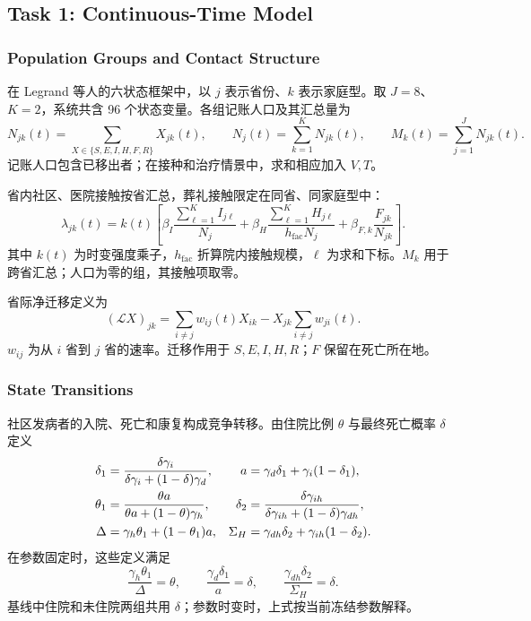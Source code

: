 \subsection{Task 1: Continuous-Time Model}
\label{sec:task-1}

\subsubsection{Population Groups and Contact Structure}

在 Legrand 等人的六状态框架\cite{legrand2007}中，以 $j$ 表示省份、$k$ 表示家庭型。取 $J=8$、$K=2$，系统共含 96 个状态变量。各组记账人口及其汇总量为
\begin{equation}
N_{jk}(t)=\sum_{X\in\{S,E,I,H,F,R\}}X_{jk}(t),\qquad
N_j(t)=\sum_{k=1}^{K}N_{jk}(t),\qquad
M_k(t)=\sum_{j=1}^{J}N_{jk}(t).
\label{eq:group-population}
\end{equation}
记账人口包含已移出者；在接种和治疗情景中，求和相应加入 $V,T$。

省内社区、医院接触按省汇总，葬礼接触限定在同省、同家庭型中：
\begin{equation}
\lambda_{jk}(t)=k(t)\left[
\beta_I\frac{\sum_{\ell=1}^{K}I_{j\ell}}{N_j}
+\beta_H\frac{\sum_{\ell=1}^{K}H_{j\ell}}{h_{\mathrm{fac}}N_j}
+\beta_{F,k}\frac{F_{jk}}{N_{jk}}
\right].
\label{eq:infection-pressure}
\end{equation}
其中 $k(t)$ 为时变强度乘子，$h_{\mathrm{fac}}$ 折算院内接触规模，$\ell$ 为求和下标。$M_k$ 用于跨省汇总；人口为零的组，其接触项取零。

省际净迁移定义为
\begin{equation}
(\mathcal{L}X)_{jk}
=\sum_{i\ne j}w_{ij}(t)X_{ik}
-X_{jk}\sum_{i\ne j}w_{ji}(t).
\label{eq:migration-operator}
\end{equation}
$w_{ij}$ 为从 $i$ 省到 $j$ 省的速率。迁移作用于 $S,E,I,H,R$；$F$ 保留在死亡所在地。

\subsubsection{State Transitions}

社区发病者的入院、死亡和康复构成竞争转移。由住院比例 $\theta$ 与最终死亡概率 $\delta$ 定义
\begin{align}
\delta_1&=\frac{\delta\gamma_i}{\delta\gamma_i+(1-\delta)\gamma_d},
& a&=\gamma_d\delta_1+\gamma_i(1-\delta_1),\notag\\
\theta_1&=\frac{\theta a}{\theta a+(1-\theta)\gamma_h},
& \delta_2&=\frac{\delta\gamma_{ih}}{\delta\gamma_{ih}+(1-\delta)\gamma_{dh}},
\label{eq:probability-coefficients}\\
\Delta&=\gamma_h\theta_1+(1-\theta_1)a,
& \Sigma_H&=\gamma_{dh}\delta_2+\gamma_{ih}(1-\delta_2).
\label{eq:exit-rates}
\end{align}
在参数固定时，这些定义满足
\begin{equation}
\frac{\gamma_h\theta_1}{\Delta}=\theta,\qquad
\frac{\gamma_d\delta_1}{a}=\delta,\qquad
\frac{\gamma_{dh}\delta_2}{\Sigma_H}=\delta.
\label{eq:branch-probabilities}
\end{equation}
基线中住院和未住院两组共用 $\delta$；参数时变时，上式按当前冻结参数解释。

